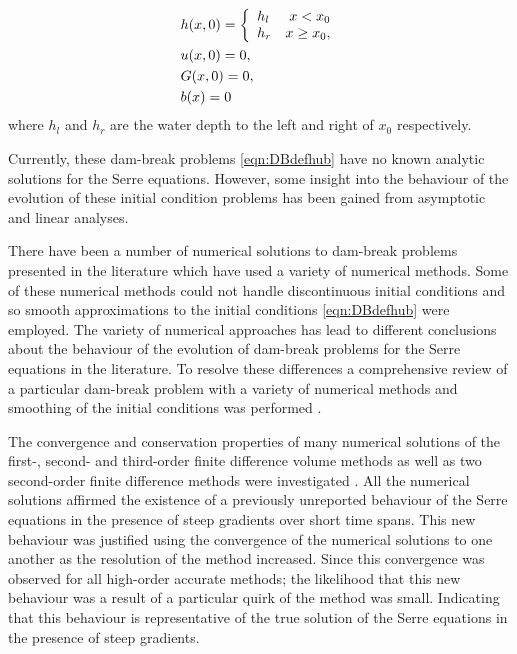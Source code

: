 \begin{subequations}
	\begin{align}
	&h(x,0) =\left\lbrace \begin{array}{l r}
	h_l & x < x_0 \\
	h_r & x \ge x_0,
	\end{array} \right. \\
	&u(x,0) = 0 , \\
	&G(x,0) = 0 , \\
	&b(x) = 0
	\end{align}
	\label{eqn:DBdefhub}
\end{subequations} 
where $h_l$ and $h_r$ are the water depth to the left and right of $x_0$ respectively. 

Currently, these dam-break problems \eqref{eqn:DBdefhub} have no known analytic solutions for the Serre equations. However, some insight into the behaviour of the evolution of these initial condition problems has been gained from asymptotic \cite{El-etal-2006} and linear \cite{Dougalis-etal-2007} analyses. 

There have been a number of numerical solutions to dam-break problems presented in the literature \cite{El-etal-2006,Hank-etal-2010-2034,Mitsotakis-etal-2014,Mitsotakis-etal-2017,doCarmo-etal-2018-404} which have used a variety of numerical methods. Some of these numerical methods could not handle discontinuous initial conditions \cite{El-etal-2006,Mitsotakis-etal-2014,Mitsotakis-etal-2017,doCarmo-etal-2018-404} and so smooth approximations to the initial conditions \eqref{eqn:DBdefhub} were employed. The variety of numerical approaches has lead to different conclusions about the behaviour of the evolution of dam-break problems for the Serre equations in the literature. To resolve these differences a comprehensive review of a particular dam-break problem with a variety of numerical methods and smoothing of the initial conditions was performed \cite{Pitt-2018-61}. 

The convergence and conservation properties of many numerical solutions of the first-, second- and third-order finite difference volume methods as well as two second-order finite difference methods were investigated \cite{Pitt-2018-61}. All the numerical solutions affirmed the existence of a previously unreported behaviour of the Serre equations in the presence of steep gradients over short time spans. This new behaviour was justified using the convergence of the numerical solutions to one another as the resolution of the method increased. Since this convergence was observed for all high-order accurate methods; the likelihood that this new behaviour was a result of a particular quirk of the method was small. Indicating that this behaviour is representative of the true solution of the Serre equations in the presence of steep gradients.

